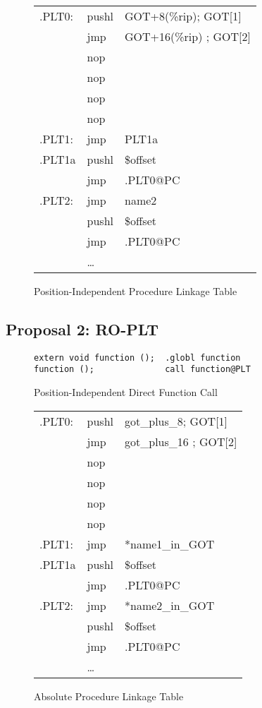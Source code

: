 \begin{figure}[H]
\caption{Position-Independent Procedure Linkage Table}
\begin{tabular}{lll}
.PLT0: & pushl & GOT+8(\%rip); GOT[1]\\
& jmp &GOT+16(\%rip) ; GOT[2] \\
& nop & \\
& nop & \\
& nop & \\
& nop & \\
.PLT1: & jmp & PLT1a\\
.PLT1a& pushl & \$offset \\
&jmp &.PLT0@PC \\
.PLT2: & jmp& name2\\
&pushl & \$offset \\
& jmp & .PLT0@PC \\
&\dots\\
\end{tabular}
\end{figure}


\subsection{Proposal 2: RO-PLT}



\begin{figure}[H]
\caption{Position-Independent Direct Function Call}
\begin{verbatim}
extern void function ();  .globl function
function ();              call function@PLT
\end{verbatim}
\end{figure}

\begin{figure}[H]
\caption{Absolute Procedure Linkage Table}
\begin{tabular}{lll}
.PLT0: & pushl & got\_plus\_8; GOT[1]\\
& jmp &got\_plus\_16 ; GOT[2] \\
& nop & \\
& nop & \\
& nop & \\
& nop & \\
.PLT1: & jmp & *name1\_in\_GOT\\
.PLT1a& pushl & \$offset \\
&jmp &.PLT0@PC \\
.PLT2: & jmp& *name2\_in\_GOT\\
&pushl & \$offset \\
& jmp & .PLT0@PC \\
&\dots\\
\end{tabular}
\end{figure}

